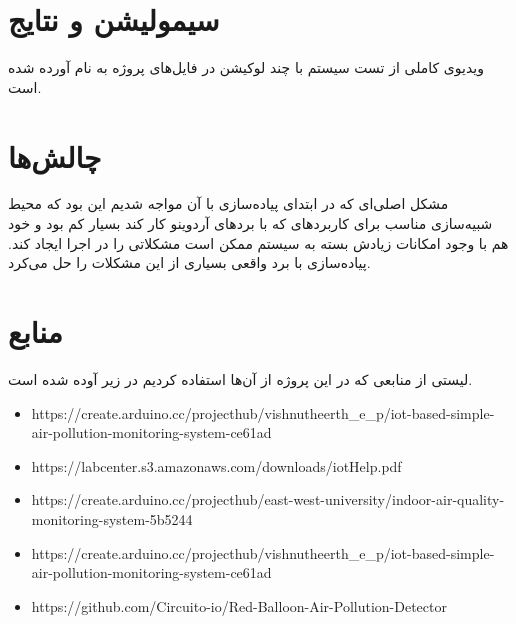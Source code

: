 \section{سیمولیشن و نتایج}
ویدیوی کاملی از تست سیستم با چند لوکیشن در فایل‌های پروژه به نام 
 آورده شده است. 


\section{چالش‌ها}
مشکل اصلی‌ای که در ابتدای پیاده‌سازی با آن مواجه شدیم این بود که محیط شبیه‌سازی مناسب‌ برای کاربرد‌های 
که با برد‌های آردوینو کار کند بسیار کم بود و خود 
هم با وجود امکانات زیادش بسته به سیستم ممکن است مشکلاتی را در اجرا ایجاد کند. پیاده‌سازی با برد واقعی بسیاری از این مشکلات را حل می‌کرد. 
\section{منابع}
 لیستی از منابعی که در این پروژه از آن‌ها استفاده کردیم در زیر آوده شده است.
 \begin{latin}
 	 \begin{itemize}
 		\item
 		https://create.arduino.cc/projecthub/vishnutheerth\_e\_p/iot-based-simple-air-pollution-monitoring-system-ce61ad
 		\item 
 		https://labcenter.s3.amazonaws.com/downloads/iotHelp.pdf
 		\item 
 		https://create.arduino.cc/projecthub/east-west-university/indoor-air-quality-monitoring-system-5b5244
 		\item 
 		https://create.arduino.cc/projecthub/vishnutheerth\_e\_p/iot-based-simple-air-pollution-monitoring-system-ce61ad
 		\item
 		https://github.com/Circuito-io/Red-Balloon-Air-Pollution-Detector
 	\end{itemize}
 \end{latin}
